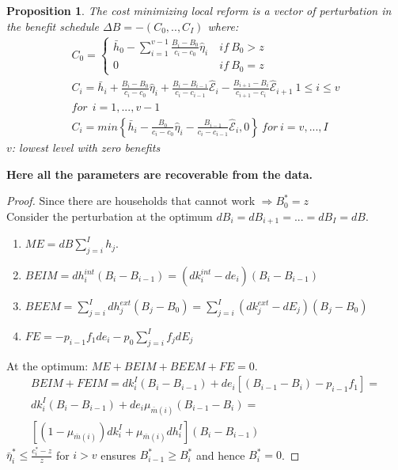 \documentclass[xcolor=pdftex,dvipsnames,table]{beamer}
\newtheorem{prop}{Proposition}
\begin{document}
\begin{frame}[label=reform]
\begin{prop}
The cost minimizing local reform is a vector of perturbation in the benefit schedule $\Delta B = -(C_0,..,C_I)$ where:
	\begin{align*}				
	 C_0 =\begin{cases}\bar{h}_0-\sum_{i=1}^{v-1}\frac{B_i-B_0}{c_i-c_0}\hat{\eta}_i\ & if\ B_0>z\\
	 0\ & if\ B_0=z \end{cases}\\
	 C_i =\bar{h}_i+\frac{B_i-B_0}{c_i-c_0}\hat{\eta}_i+\frac{B_i-B_{i-1}}{c_i-c_{i-1}}\hat{\mathcal{E}}_i-\frac{B_{i+1}-B_{i}}{c_{i+1}-c_{i}}\hat{\mathcal{E}}_{i+1}\ 1\leq i\leq v\\ for\ \ i =1,...,v-1\\
	 C_{i} =min\left\{\bar{h}_{i}-\frac{B_0}{c_{i}-c_0}\hat{\eta}_{i}-\frac{B_{i-1}}{c_{i}-c_{i-1}}\hat{\mathcal{E}}_{i},0\right\}\ for\ i=v,...,I
	\end{align*}
	 $v$: lowest level with zero benefits
\end{prop}	
\pause
\begin{block}

\textbf{Here all the parameters are recoverable from the data.}
\end{block}
\hyperlink{implications}{}
\end{frame}

\begin{frame}[label=proof_main]
\begin{proof}
Since there are households that cannot work $\Rightarrow B_0^*=z$ \\
\pause
Consider the perturbation at the optimum $dB_i=dB_{i+1}=...=dB_I=dB$. \\
\begin{enumerate}
\pause
\item $ME =  dB\sum_{j=i}^Ih_j$.\\
\pause
\item $BEIM = dh^{int}_i(B_i-B_{i-1})= (dk^{int}_i-de_i)(B_i-B_{i-1})$\\
\pause
\item $BEEM = \sum_{j=i}^Idh^{ext}_j(B_j-B_0) =\sum_{j=i}^I(dk^{ext}_j-dE_j)(B_j-B_0) $\\
\pause
\item $FE =-p_{i-1}f_1de_i-p_{0}\sum_{j=i}^If_jdE_j$\\
\end{enumerate}
\pause
At the optimum: $ME + BEIM + BEEM +FE= 0$.
\pause
\begin{align*}
BEIM+FEIM=dk^I_i(B_i-B_{i-1})+de_i[(B_{i-1}-B_{i})-p_{i-1}f_1]=\\
dk^I_i(B_i-B_{i-1})+de_i\mu_{\bar{m}(i)}(B_{i-1}-B_{i})=\\
\left[(1-\mu_{\bar{m}(i)})dk^I_i+\mu_{\bar{m}(i)} dh_i^I\right](B_i-B_{i-1})
\end{align*} 
\pause
$\bar{\eta}^{*}_i\leq \frac{c^*_i-z}{z}$  for $i>v$ ensures  $B^*_{i-1}\geq B^*_i$ and hence $B^*_i=0$.
\end{proof}
\hyperlink{prop_imp}{}
\end{frame}
\end{document}
